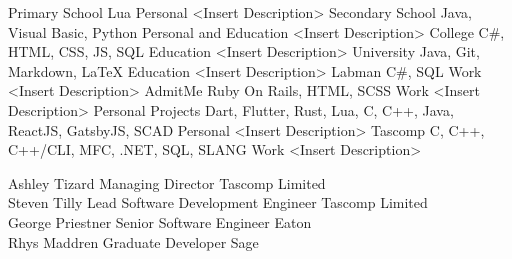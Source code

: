 \documentclass[9pt]{developercv} %
\begin{document}


\begin{entrylist}
	\entry
		{Primary School}
		{Lua}
		{Personal}
		{<Insert Description>}
	\entry
		{Secondary School}
		{Java, Visual Basic, Python}
		{Personal and Education}
		{<Insert Description>}
	\entry
		{College}
		{C\#, HTML, CSS, JS, SQL}
		{Education}
		{<Insert Description>}
	\entry
		{University}
		{Java, Git, Markdown, LaTeX}
		{Education}
		{<Insert Description>}
	\entry
		{Labman}
		{C\#, SQL}
		{Work}
		{<Insert Description>}
	\entry
		{AdmitMe}
		{Ruby On Rails, HTML, SCSS}
		{Work}
		{<Insert Description>}
	\entry
		{Personal Projects}
		{Dart, Flutter, Rust, Lua, C, C++, Java, ReactJS, GatsbyJS, SCAD}
		{Personal}
		{<Insert Description>}
	\entry
		{Tascomp}
		{C, C++, C++/CLI, MFC, .NET, SQL, SLANG}
		{Work}
		{<Insert Description>}
\end{entrylist}




\begin{entrylist}
	\entry
		{Ashley Tizard}
		{Managing Director}
		{Tascomp Limited}
		{\\}
	\entry
		{Steven Tilly}
		{Lead Software Development Engineer}
		{Tascomp Limited}
		{\\}
	\entry
		{George Priestner}
		{Senior Software Engineer}
		{Eaton}
		{\\}
	\entry
		{Rhys Maddren}
		{Graduate Developer}
		{Sage}
		{\\}
\end{entrylist}

\end{document}
